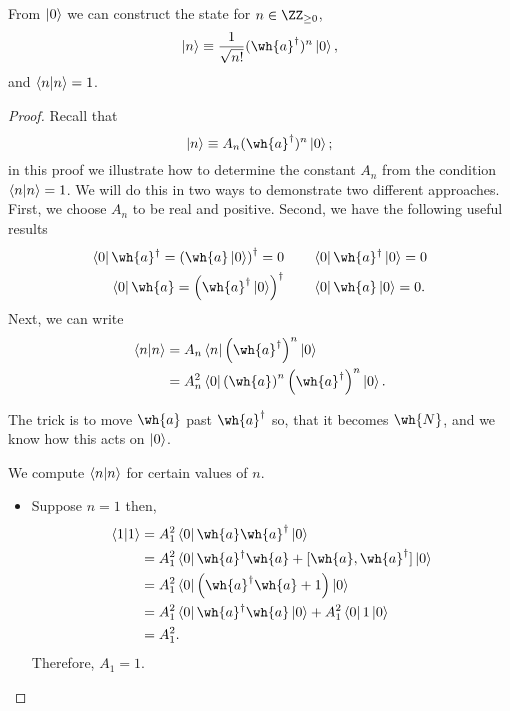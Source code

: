 \documentclass[12pt, a4paper]{article}
\begin{document}
\begin{mdthm}
    From \(\ket{0}\) we can construct the state for \(n \in \ZZ_{\geq 0}\),
    \[\ket{n} \equiv \frac{1}{\sqrt{n!}} (\wh{a}^{\dagger})^n \ket{0},\]
    and \(\bra{n}\ket{n}=1\).
\end{mdthm}

\begin{proof}
    Recall that 
    \[\ket{n} \equiv A_n (\wh{a}^{\dagger})^n \ket{0};\]
    in this proof we illustrate how to determine the constant \(A_n\) from the condition \(\bra{n}\ket{n}=1\). We will do this in two ways to demonstrate two different approaches. First, we choose \(A_n\) to be real and positive. Second, we have the following useful results 
    \[\begin{aligned}
        \bra{0} \wh{a}^{\dagger} = \left( \wh{a} \ket{0} \right)^{\dagger}=0 \quad & \quad \bra{0} \wh{a}^{\dagger} \ket{0} =0 \\
        \bra{0} \wh{a}= \left( \wh{a}^{\dagger} \ket{0} \right)^{\dagger} \quad & \quad \bra{0} \wh{a} \ket{0}=0.
    \end{aligned}\]
    Next, we can write
    \[\begin{aligned}
        \bra{n}\ket{n} &= A_n \bra{n} \left( \wh{a}^{\dagger} \right)^n \ket{0} \\
        &= A_n^2 \bra{0} \left( \wh{a} \right)^n \left( \wh{a}^{\dagger} \right)^n \ket{0}.
    \end{aligned}\]
    \begin{mdnote}
        The trick is to move \(\wh{a}\) past \(\wh{a}^{\dagger}\) so, that it becomes \(\wh{N}\), and we know how this acts on \(\ket{0}\).
    \end{mdnote}
    We compute \(\bra{n}\ket{n}\) for certain values of \(n\).
    \begin{itemize}
        \item Suppose \(n=1\) then,
        \[\begin{aligned}
            \bra{1} \ket{1} &= A_1^2 \bra{0} \wh{a}\wh{a}^{\dagger}\ket{0} \\
            &= A_1^2 \bra{0} \wh{a}^{\dagger} \wh{a}+[\wh{a},\wh{a}^{\dagger}] \ket{0} \\
            &= A_1^2\bra{0} \left( \wh{a}^{\dagger}\wh{a}+1 \right) \ket{0} \\
            &= A_1^2\bra{0} \wh{a}^{\dagger} \wh{a}\ket{0}+A_1^2\bra{0}1\ket{0} \\
            &= A_1^2.
        \end{aligned}\]
        Therefore, \(A_1 =1\).

\end{itemize}
\end{proof}
\end{document}
